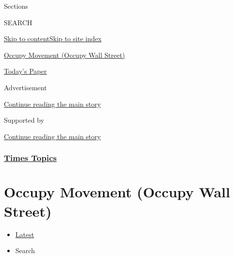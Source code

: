 Sections

SEARCH

\protect\hyperlink{site-content}{Skip to
content}\protect\hyperlink{site-index}{Skip to site index}

\href{https://www.nytimes3xbfgragh.onion/topic/organization/occupy-movement-occupy-wall-street}{Occupy
Movement (Occupy Wall Street)}

\href{https://myaccount.nytimes3xbfgragh.onion/auth/login?response_type=cookie\&client_id=vi}{}

\href{https://www.nytimes3xbfgragh.onion/section/todayspaper}{Today's
Paper}

Advertisement

\protect\hyperlink{after-top}{Continue reading the main story}

Supported by

\protect\hyperlink{after-sponsor}{Continue reading the main story}

\hypertarget{times-topics}{%
\subsubsection{\texorpdfstring{\href{/index.html}{Times
Topics}}{Times Topics}}\label{times-topics}}

\hypertarget{occupy-movement-occupy-wall-street}{%
\section{Occupy Movement (Occupy Wall
Street)}\label{occupy-movement-occupy-wall-street}}

\begin{itemize}
\tightlist
\item
  \protect\hyperlink{stream-panel}{Latest}
\item
  Search
\end{itemize}

